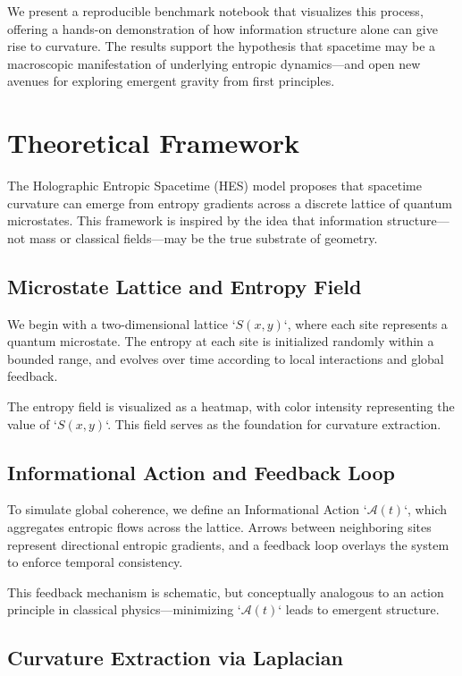 \documentclass[12pt]{article}
\begin{document}
We present a reproducible benchmark notebook that visualizes this process, offering a hands-on demonstration of how information structure alone can give rise to curvature. The results support the hypothesis that spacetime may be a macroscopic manifestation of underlying entropic dynamics—and open new avenues for exploring emergent gravity from first principles.

\section{Theoretical Framework}

The Holographic Entropic Spacetime (HES) model proposes that spacetime curvature can emerge from entropy gradients across a discrete lattice of quantum microstates. This framework is inspired by the idea that information structure—not mass or classical fields—may be the true substrate of geometry.

\subsection{Microstate Lattice and Entropy Field}

We begin with a two-dimensional lattice `\( S(x, y) \)`, where each site represents a quantum microstate. The entropy at each site is initialized randomly within a bounded range, and evolves over time according to local interactions and global feedback.

The entropy field is visualized as a heatmap, with color intensity representing the value of `\( S(x, y) \)`. This field serves as the foundation for curvature extraction.

\subsection{Informational Action and Feedback Loop}

To simulate global coherence, we define an Informational Action `\( \mathcal{A}(t) \)`, which aggregates entropic flows across the lattice. Arrows between neighboring sites represent directional entropic gradients, and a feedback loop overlays the system to enforce temporal consistency.

This feedback mechanism is schematic, but conceptually analogous to an action principle in classical physics—minimizing `\( \mathcal{A}(t) \)` leads to emergent structure.

\subsection{Curvature Extraction via Laplacian}
\end{document}

